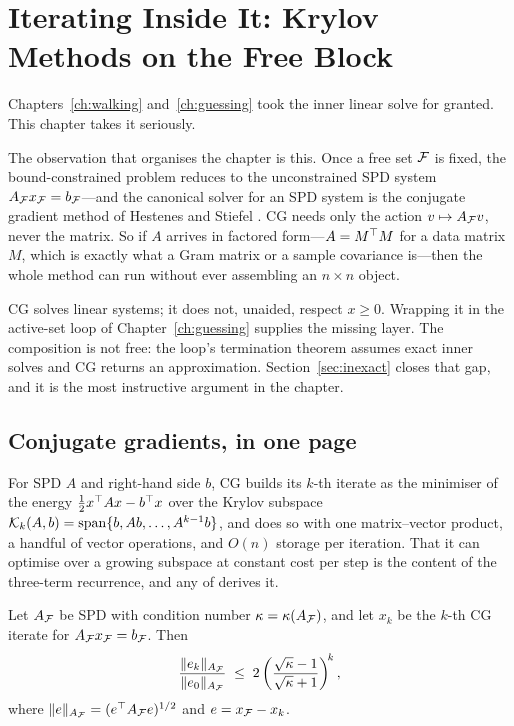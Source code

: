 \chapter{Iterating Inside It: Krylov Methods on the Free Block}
\label{ch:krylov}

Chapters~\ref{ch:walking} and~\ref{ch:guessing} took the inner linear solve for
granted. This chapter takes it seriously.

The observation that organises the chapter is this. Once a free set $\mathcal{F}$ is
fixed, the bound-constrained problem reduces to the unconstrained SPD system
$A_{\mathcal{F}} x_{\mathcal{F}} = b_{\mathcal{F}}$---and the canonical solver for an SPD system is the
conjugate gradient method of Hestenes and Stiefel \cite{hestenes1952}. CG needs
only the action $v \mapsto A_{\mathcal{F}} v$, never the matrix. So if $A$ arrives in
factored form---$A = M^{\top} M$ for a data matrix $M$, which is exactly what a Gram
matrix or a sample covariance is---then the whole method can run without ever
assembling an $n \times n$ object.

CG solves linear systems; it does not, unaided, respect $x \ge 0$. Wrapping it in
the active-set loop of Chapter~\ref{ch:guessing} supplies the missing layer. The
composition is not free: the loop's termination theorem assumes exact inner solves
and CG returns an approximation. Section~\ref{sec:inexact} closes that gap, and it
is the most instructive argument in the chapter.

\section{Conjugate gradients, in one page}

For SPD $A$ and right-hand side $b$, CG builds its $k$-th iterate as the minimiser
of the energy $\tfrac12 x^{\top} A x - b^{\top} x$ over the Krylov subspace
$\mathcal{K}_k(A,b) = \mathrm{span}\{b, Ab, \dots, A^{k-1}b\}$, and does so with one
matrix--vector product, a handful of vector operations, and $O(n)$ storage per
iteration. That it can optimise over a growing subspace at constant cost per step
is the content of the three-term recurrence, and any of
\cite{golub2013,greenbaum1997,trefethenbau1997} derives it.

\begin{proposition}[CG convergence]
\label{prop:cg}
Let $A_{\mathcal{F}}$ be SPD with condition number $\kappa = \kappa(A_{\mathcal{F}})$, and let $x_k$
be the $k$-th CG iterate for $A_{\mathcal{F}} x_{\mathcal{F}} = b_{\mathcal{F}}$. Then
\[
  \frac{\lVert e_k \rVert_{A_{\mathcal{F}}}}{\lVert e_0 \rVert_{A_{\mathcal{F}}}}
  \;\le\;
  2\left(\frac{\sqrt{\kappa}-1}{\sqrt{\kappa}+1}\right)^{\!k},
\]
where $\lVert e \rVert_{A_{\mathcal{F}}} = (e^{\top} A_{\mathcal{F}} e)^{1/2}$ and
$e = x_{\mathcal{F}} - x_k$.
\end{proposition}


